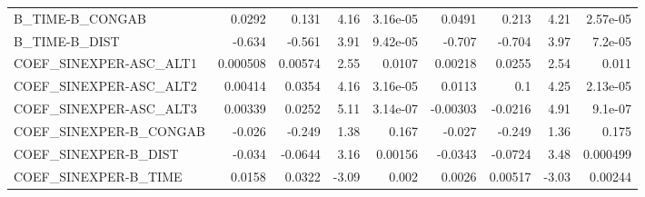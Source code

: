 \begin{tabular}{lrrrrrrrr}
B\_TIME-B\_CONGAB        &      0.0292 &        0.131 &    4.16 & 3.16e-05 &     0.0491 &       0.213 &         4.21 &      2.57e-05 \\
B\_TIME-B\_DIST          &      -0.634 &       -0.561 &    3.91 & 9.42e-05 &     -0.707 &      -0.704 &         3.97 &       7.2e-05 \\
COEF\_SINEXPER-ASC\_ALT1 &    0.000508 &      0.00574 &    2.55 &   0.0107 &    0.00218 &      0.0255 &         2.54 &         0.011 \\
COEF\_SINEXPER-ASC\_ALT2 &     0.00414 &       0.0354 &    4.16 & 3.16e-05 &     0.0113 &         0.1 &         4.25 &      2.13e-05 \\
COEF\_SINEXPER-ASC\_ALT3 &     0.00339 &       0.0252 &    5.11 & 3.14e-07 &   -0.00303 &     -0.0216 &         4.91 &       9.1e-07 \\
COEF\_SINEXPER-B\_CONGAB &      -0.026 &       -0.249 &    1.38 &    0.167 &     -0.027 &      -0.249 &         1.36 &         0.175 \\
COEF\_SINEXPER-B\_DIST   &      -0.034 &      -0.0644 &    3.16 &  0.00156 &    -0.0343 &     -0.0724 &         3.48 &      0.000499 \\
COEF\_SINEXPER-B\_TIME   &      0.0158 &       0.0322 &   -3.09 &    0.002 &     0.0026 &     0.00517 &        -3.03 &       0.00244 \\
\bottomrule
\end{tabular}
